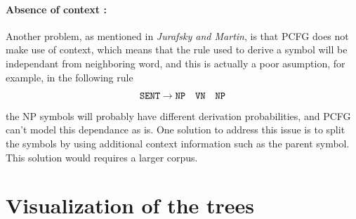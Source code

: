 \documentclass[a4paper, 11pt]{article}
\begin{document}
\paragraph{Absence of context :}

Another problem, as mentioned in \emph{Jurafsky and Martin}, is that
PCFG does not make use of context, which means that the rule used to
derive a symbol will be independant from neighboring word, and this is
actually a poor asumption, for example, in the following rule
\begin{displaymath}
  \verb+SENT+ \to \verb+NP+\hspace{1em}\verb+VN+\hspace{1em}\verb+NP+
\end{displaymath}
the NP symbols will probably have different derivation probabilities,
and PCFG can't model this dependance as is. One solution to address this
issue is to split the symbols by using additional context information
such as the parent symbol. This solution would requires a larger
corpus.






\newpage
\appendix

\section{Visualization of the trees}
\label{sec:visualization}
\end{document}

